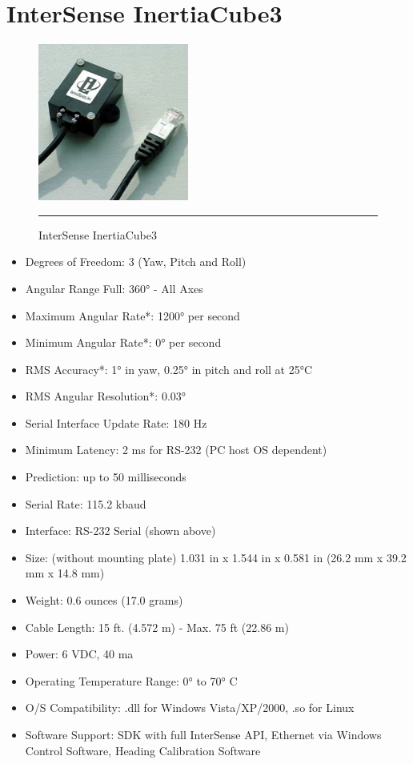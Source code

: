 \chapter{InterSense InertiaCube3}
\label{AppendixD}

\begin{figure}[htbp]
  \centering
    \includegraphics{./Primitives/inertiacube3.png}
    \rule{35em}{0.5pt}
  \caption[InterSense InertiaCube3]{InterSense InertiaCube3}
\end{figure}

\begin{itemize}
	\item Degrees of Freedom: 3 (Yaw, Pitch and Roll) 
	\item Angular Range Full: 360° - All Axes 
	\item Maximum Angular Rate*: 1200° per second 
	\item Minimum Angular Rate*: 0° per second 
	\item RMS Accuracy*: 1° in yaw, 0.25° in pitch and roll at 25°C 
	\item RMS Angular Resolution*: 0.03° 
	\item Serial Interface Update Rate: 180 Hz 
	\item Minimum Latency: 2 ms for RS-232 (PC host OS dependent) 
	\item Prediction: up to 50 milliseconds 
	\item Serial Rate: 115.2 kbaud 
	\item Interface: RS-232 Serial (shown above) 
	\item Size: (without mounting plate) 1.031 in x 1.544 in x 0.581 in (26.2 mm x 39.2 mm x 14.8 mm) 
	\item Weight: 0.6 ounces (17.0 grams) 
	\item Cable Length: 15 ft. (4.572 m) - Max. 75 ft (22.86 m) 
	\item Power: 6 VDC, 40 ma 
	\item Operating Temperature Range: 0° to 70° C 
	\item O/S Compatibility: .dll for Windows Vista/XP/2000, .so for Linux 
	\item Software Support: SDK with full InterSense API, Ethernet via Windows Control Software, Heading Calibration Software
\end{itemize}
